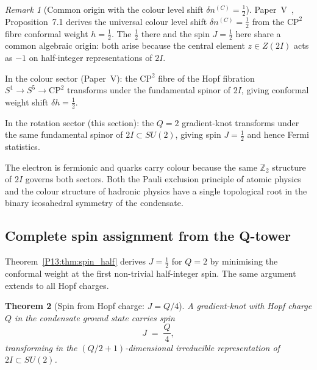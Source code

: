 \documentclass[11pt,a4paper]{article}
\newtheorem{theorem}{Theorem}[section]
\theoremstyle{definition}
\theoremstyle{remark}
\newtheorem{remark}[theorem]{Remark}
\begin{document}
\begin{remark}[Common origin with the colour level shift $\delta n^{(C)}=\tfrac{1}{2}$]
\label{P13:rem:delta_n_half_origin}
Paper~V~\cite{Paper5}, Proposition~7.1 derives the
universal colour level shift $\delta n^{(C)}=\tfrac{1}{2}$ from the
$\mathrm{CP}^2$ fibre conformal weight $h=\tfrac{1}{2}$.
The $\tfrac{1}{2}$ there and the spin $J=\tfrac{1}{2}$ here share a
common algebraic origin: both arise because the central element
$z\in Z(2I)$ acts as $-1$ on half-integer representations of $2I$.

In the colour sector (Paper~V): the $\mathrm{CP}^2$ fibre of the Hopf
fibration $S^1\to S^5\to\mathrm{CP}^2$ transforms under the fundamental
spinor of $2I$, giving conformal weight shift
$\delta h = \tfrac{1}{2}$.

In the rotation sector (this section): the $Q=2$ gradient-knot transforms
under the same fundamental spinor of $2I\subset SU(2)$, giving spin
$J=\tfrac{1}{2}$ and hence Fermi statistics.

The electron is fermionic and quarks carry colour because the same
$\mathbb{Z}_2$ structure of $2I$ governs both sectors.
Both the Pauli exclusion principle of atomic physics and the colour
structure of hadronic physics have a single topological root in the
binary icosahedral symmetry of the condensate.
\end{remark}

\subsection{Complete spin assignment from the Q-tower}
\label{P13:sec:spin_tower}

Theorem~\ref{P13:thm:spin_half} derives $J=\tfrac{1}{2}$ for $Q=2$ by
minimising the conformal weight at the first non-trivial half-integer spin.
The same argument extends to all Hopf charges.

\begin{theorem}[Spin from Hopf charge: $J=Q/4$]
\label{P13:thm:spin_tower}
A gradient-knot with Hopf charge $Q$ in the condensate ground state
carries spin
\begin{equation}
  \boxed{J \;=\; \frac{Q}{4},}
  \label{P13:eq:J_Q4}
\end{equation}
transforming in the $(Q/2+1)$-dimensional irreducible representation
of $2I\subset SU(2)$.
\end{theorem}
\end{document}
